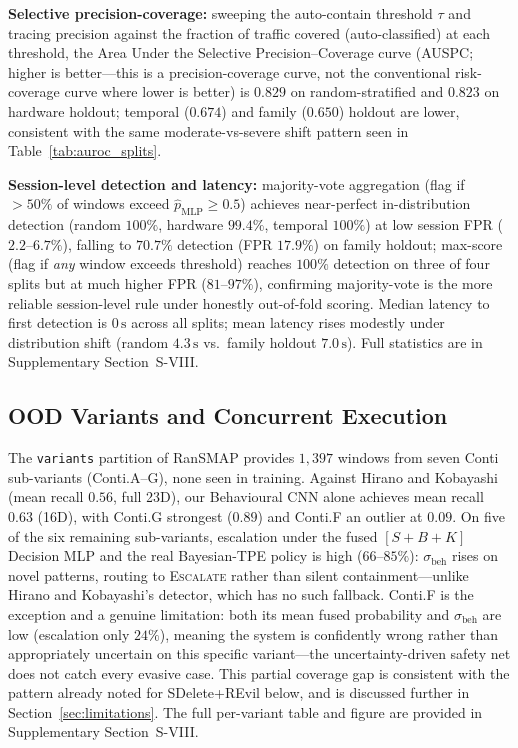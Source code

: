 \documentclass[journal]{IEEEtran}
\begin{document}
\textbf{Selective precision-coverage:} sweeping the auto-contain threshold
$\tau$ and tracing precision against the fraction of traffic covered
(auto-classified) at each threshold, the Area Under the Selective
Precision--Coverage curve (AUSPC; higher is better---this is a
precision-coverage curve, not the conventional risk-coverage curve where
lower is better) is $0.829$ on random-stratified and $0.823$ on hardware
holdout; temporal ($0.674$) and family ($0.650$) holdout are lower,
consistent with the same moderate-vs-severe shift pattern seen in
Table~\ref{tab:auroc_splits}.

\textbf{Session-level detection and latency:} majority-vote aggregation
(flag if $>50\%$ of windows exceed $\hat{p}_{\text{MLP}}{\geq}0.5$)
achieves near-perfect in-distribution detection (random $100\%$, hardware
$99.4\%$, temporal $100\%$) at low session FPR ($2.2$--$6.7\%$), falling to
$70.7\%$ detection (FPR $17.9\%$) on family holdout; max-score (flag if
\emph{any} window exceeds threshold) reaches $100\%$ detection on three of
four splits but at much higher FPR ($81$--$97\%$), confirming majority-vote
is the more reliable session-level rule under honestly out-of-fold scoring.
Median latency to first detection is $0\,\text{s}$ across all splits; mean
latency rises modestly under distribution shift (random $4.3\,\text{s}$ vs.\
family holdout $7.0\,\text{s}$). Full statistics are in Supplementary
Section~S-VIII.

\subsection{OOD Variants and Concurrent Execution}\label{sec:ood_variants}

The \texttt{variants} partition of RanSMAP provides $1{,}397$ windows from
seven Conti sub-variants (Conti.A--G), none seen in training. Against
Hirano and Kobayashi~\cite{hirano2025ransmap} (mean recall $0.56$, full
23D), our Behavioural CNN alone achieves mean recall $0.63$ (16D), with
Conti.G strongest ($0.89$) and Conti.F an outlier at $0.09$. On five of
the six remaining sub-variants, escalation under the fused $[S{+}B{+}K]$
Decision MLP and the real Bayesian-TPE policy is high ($66$--$85\%$):
$\sigma_{\text{beh}}$ rises on novel patterns, routing to
\textsc{Escalate} rather than silent containment---unlike Hirano and
Kobayashi's detector, which has no such fallback. Conti.F is the
exception and a genuine limitation: both its mean fused probability and
$\sigma_{\text{beh}}$ are low (escalation only $24\%$), meaning the system
is confidently wrong rather than appropriately uncertain on this specific
variant---the uncertainty-driven safety net does not catch every evasive
case. This partial coverage gap is consistent with the pattern already
noted for SDelete+REvil below, and is discussed further in
Section~\ref{sec:limitations}. The full per-variant table and figure are
provided in Supplementary Section~S-VIII.
\end{document}
